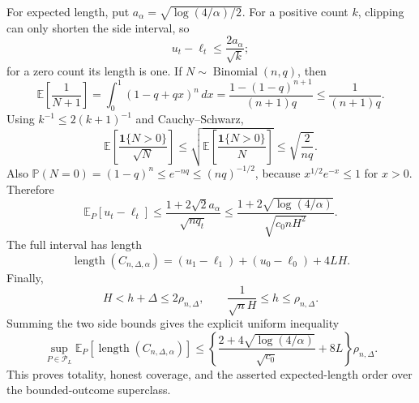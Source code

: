 For expected length, put \(a_\alpha=\sqrt{\log(4/\alpha)/2}\).  For a positive count \(k\), clipping can only shorten the side interval, so
\[
 u_t-\ell_t\leq\frac{2a_\alpha}{\sqrt k};
\]
for a zero count its length is one.  If \(N\sim\operatorname{Binomial}(n,q)\), then
\[
 \mathbb E\!\left[\frac1{N+1}\right]
 =\int_0^1(1-q+qx)^n\,dx
 =\frac{1-(1-q)^{n+1}}{(n+1)q}
 \leq\frac1{(n+1)q}.
\]
Using \(k^{-1}\leq2(k+1)^{-1}\) and Cauchy--Schwarz,
\[
 \mathbb E\!\left[\frac{\mathbf1\{N>0\}}{\sqrt N}\right]
 \leq\sqrt{\mathbb E\!\left[\frac{\mathbf1\{N>0\}}N\right]}
 \leq\sqrt{\frac2{nq}}.
\]
Also \(\mathbb P(N=0)=(1-q)^n\leq e^{-nq}\leq(nq)^{-1/2}\), because \(x^{1/2}e^{-x}\leq1\) for \(x>0\).  Therefore
\[
 \mathbb E_P[u_t-\ell_t]
 \leq\frac{1+2\sqrt2a_\alpha}{\sqrt{nq_t}}
 \leq\frac{1+2\sqrt{\log(4/\alpha)}}{\sqrt{c_0nH^2}}.
\]
The full interval has length
\[
 \operatorname{length}(C_{n,\Delta,\alpha})
 =(u_1-\ell_1)+(u_0-\ell_0)+4LH.
\]
Finally,
\[
 H<h+\Delta\leq2\rho_{n,\Delta},
 \qquad
 \frac1{\sqrt nH}\leq h\leq\rho_{n,\Delta}.
\]
Summing the two side bounds gives the explicit uniform inequality
\[
 \sup_{P\in\mathcal P_L}\mathbb E_P[\operatorname{length}(C_{n,\Delta,\alpha})]
 \leq
 \left\{
 \frac{2+4\sqrt{\log(4/\alpha)}}{\sqrt{c_0}}+8L
 \right\}\rho_{n,\Delta}.
\]
This proves totality, honest coverage, and the asserted expected-length order over the bounded-outcome superclass.